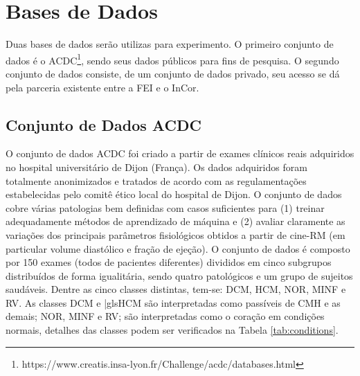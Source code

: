 \section{Bases de Dados} 
\label{subsec:cap4_dataset}

Duas bases de dados serão utilizas para experimento. O primeiro conjunto de dados é o \gls{ACDC}\footnote{https://www.creatis.insa-lyon.fr/Challenge/acdc/databases.html}, sendo seus dados públicos para fins de pesquisa. O segundo conjunto de dados consiste, de um conjunto de dados privado, seu acesso se dá pela parceria existente entre a \gls{FEI} e o \gls{InCor}.

\subsection{Conjunto de Dados ACDC} 
\label{subsec:cap4_acdc}

O conjunto de dados \gls{ACDC} foi criado a partir de exames clínicos reais adquiridos no hospital universitário de Dijon (França). Os dados adquiridos foram totalmente anonimizados e tratados de acordo com as regulamentações estabelecidas pelo comitê ético local do hospital de Dijon. O conjunto de dados cobre várias patologias bem definidas com casos suficientes para (1) treinar adequadamente métodos de aprendizado de máquina e (2) avaliar claramente as variações dos principais parâmetros fisiológicos obtidos a partir de cine-RM (em particular volume diastólico e fração de ejeção). O conjunto de dados é composto por 150 exames (todos de pacientes diferentes) divididos em cinco subgrupos distribuídos de forma igualitária, sendo quatro patológicos e um grupo de sujeitos saudáveis. Dentre as cinco classes distintas, tem-se: \gls{DCM}, \gls{HCM}, \gls{NOR}, \gls{MINF} e \gls{RV}. As classes \gls{DCM} e |gls{HCM} são interpretadas como passíveis de \gls{CMH} e as demais; \gls{NOR}, \gls{MINF} e \gls{RV}; são interpretadas como o coração em condições normais, detalhes das classes podem ser verificados na Tabela \ref{tab:conditions}. 

